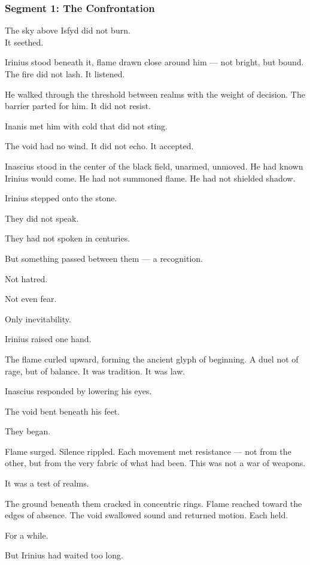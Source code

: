 \documentclass[9pt]{article}
\begin{document}
\newpage

\subsubsection*{Segment 1: The Confrontation}

The sky above Isfyd did not burn.\\
It seethed.

Irinius stood beneath it, flame drawn close around him — not bright, but bound. The fire did not lash. It listened.

He walked through the threshold between realms with the weight of decision. The barrier parted for him. It did not resist.

Inanis met him with cold that did not sting.

The void had no wind. It did not echo. It accepted.

Inascius stood in the center of the black field, unarmed, unmoved. He had known Irinius would come. He had not summoned flame. He had not shielded shadow.

Irinius stepped onto the stone.

They did not speak.

They had not spoken in centuries.

But something passed between them — a recognition.

Not hatred.

Not even fear.

Only inevitability.

Irinius raised one hand.

The flame curled upward, forming the ancient glyph of beginning. A duel not of rage, but of balance. It was tradition. It was law.

Inascius responded by lowering his eyes.

The void bent beneath his feet.

They began.

Flame surged. Silence rippled. Each movement met resistance — not from the other, but from the very fabric of what had been. This was not a war of weapons.

It was a test of realms.

The ground beneath them cracked in concentric rings. Flame reached toward the edges of absence. The void swallowed sound and returned motion. Each held.

For a while.

But Irinius had waited too long.
\end{document}
